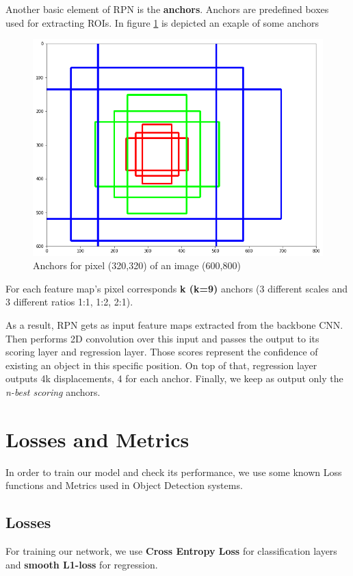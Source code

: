 \documentclass{report}
\begin{document}
Another basic element of RPN is the \textbf{anchors}. Anchors are predefined boxes used for extracting ROIs. In figure \ref{fig:anchors} is
depicted an exaple of some anchors
\begin{figure}[h]
  \centering
  \includegraphics[scale=0.3]{anchors}
  \caption{ Anchors for pixel (320,320) of an image (600,800) }
  \label{fig:anchors}
\end{figure}

For each feature map's pixel corresponds \textbf{k (k=9)} anchors (3 different scales and 3 different ratios 1:1, 1:2, 2:1). \par
As a result, RPN gets as input feature maps extracted from the backbone CNN. Then performs 2D convolution over this input and passes
the output to its scoring layer and regression layer. Those scores represent the confidence of existing an object in this specific position.
On top of that, regression layer outputs 4k displacements, 4 for each anchor. Finally, we keep as output only the \textit{ n-best scoring} anchors.

\section{Losses and Metrics}
In order to train our model and check its performance, we use some known Loss functions and Metrics used in Object Detection systems.
\subsection{Losses}
For training our network, we use \textbf{Cross Entropy Loss} for classification layers and \textbf{smooth L1-loss} for regression.
\end{document}
